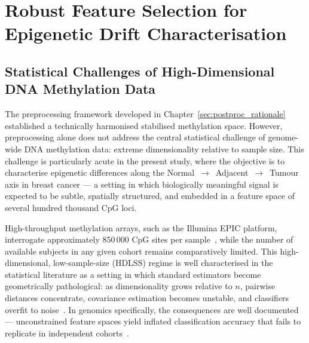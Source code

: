 \chapter{Robust Feature Selection for Epigenetic Drift Characterisation}
\label{chap:feature_selection}







\section{Statistical Challenges of High-Dimensional DNA Methylation Data}
\label{sec:fs_hdlss}

The preprocessing framework developed in Chapter~\ref{sec:postproc_rationale} 
established a technically harmonised stabilised methylation space. 
However, preprocessing alone does not address the central statistical challenge 
of genome-wide DNA methylation data: extreme dimensionality relative to sample 
size. This challenge is particularly acute in the present study, where the 
objective is to characterise epigenetic differences along the 
Normal~$\to$~Adjacent~$\to$~Tumour axis in breast cancer — a setting in which 
biologically meaningful signal is expected to be subtle, spatially structured, 
and embedded in a feature space of several hundred thousand CpG loci.

High-throughput methylation arrays, such as the Illumina EPIC platform, 
interrogate approximately 850\,000 CpG sites per sample~\cite{Pidsley2016}, 
while the number of available subjects in any given cohort remains 
comparatively limited. This high-dimensional, low-sample-size (HDLSS) regime 
is well characterised in the statistical literature as a setting in which 
standard estimators become geometrically pathological: as dimensionality grows 
relative to $n$, pairwise distances concentrate, covariance estimation becomes 
unstable, and classifiers overfit to noise~\cite{Hall2005, Donoho2000}. In 
genomics specifically, the consequences are well documented — unconstrained 
feature spaces yield inflated classification accuracy that fails to replicate 
in independent cohorts~\cite{Ambroise2002, Smialowski2010}.

